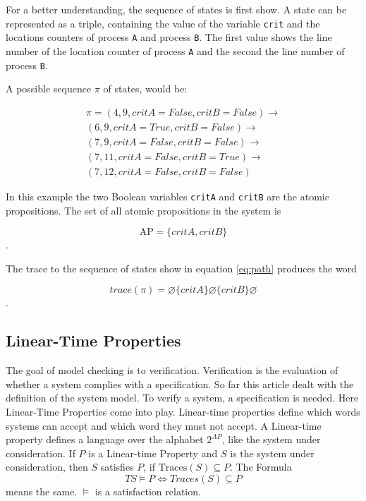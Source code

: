 \documentclass[a4paper, twoside]{article}
\begin{document}
For a better understanding, the sequence of states is first show. A state can be represented as a triple, containing the value of the variable \verb|crit| and the locations counters of process \verb|A| and process \verb|B|. The first value shows the line number of the location counter of process \verb|A| and the second the line number of process \verb|B|.

A possible sequence $\pi$ of states, would be:

\begin{equation}
  \label{eq:path}
  \begin{split}
\pi = (4, 9, {critA}={False},{critB}=False) \rightarrow \\
(6, 9, {critA}={True},{critB}=False) \rightarrow \\
(7, 9, {critA}={False},{critB}=False) \rightarrow \\
(7, 11, {critA}={False},{critB}=True) \rightarrow \\
(7, 12, {critA}={False},{critB}=False)
  \end{split}
\end{equation}

In this example the two Boolean variables \verb|critA| and \verb|critB| are the atomic propositions. The set of all atomic propositions in the system is

\[
\text{AP}=\{critA, critB\}
\].

The trace to the sequence of states show in equation \ref{eq:path} produces the word

\[
trace(\pi) = \varnothing \{critA\} \varnothing \{critB\} \varnothing
\].

\subsection{Linear-Time Properties}
\label{sec:satisfactionrelations}

The goal of model checking is to verification. Verification is the evaluation of whether a system complies with a specification. So far this article dealt with the definition of the system model. To verify a system, a specification is needed. Here Linear-Time Properties come into play. Linear-time properties define which words systems can accept and which word they must not accept. A Linear-time property defines a language over the alphabet $2^{AP}$, like the system under consideration. If $P$ is a Linear-time Property and $S$ is the system under consideration, then $S$ satisfies $P$, if $\text{Traces}(S) \subseteq P$. The Formula 
\[
TS \models P \iff Traces(S) \subseteq P 
\]
means the same. $ \models $ is a satisfaction relation.
\end{document}
